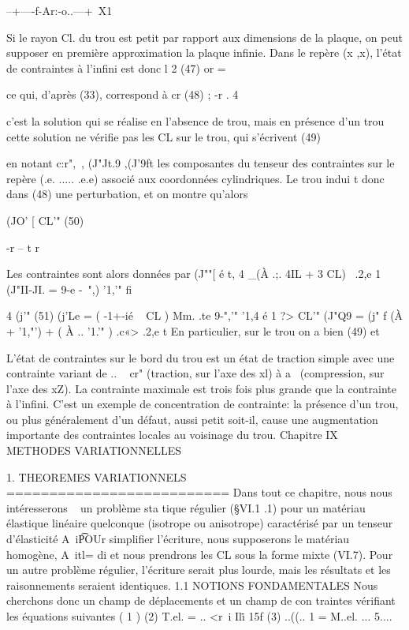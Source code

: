 {{{{{--+----f-Ar:-o..---+~X1 


Si le rayon Cl. du trou est petit par rapport aux dimensions de la plaque, on peut supposer en première approximation la plaque infinie. Dans le repère (x ,x), l'état de contraintes à l'infini est donc
l 2
(47) or 
= 

ce qui, d'après (33), correspond à 
cr­
(48) ; -r 
. 4 

c'est la solution qui se réalise en l'absence de trou, mais en présence d'un trou cette solution ne vérifie pas les CL sur le trou, qui s'écrivent 
(49) 


en notant c:r",~, (J"Jt.9 ,(J'9ft les composantes du tenseur des contraintes sur le repère (.e. ..... .e.e) associé aux coordonnées cylindriques. Le trou indui t donc dans (48) une perturbation, et on montre qu'alors 

(JO' [ CL'"
(50) 

-r --­
t r 

Les contraintes sont alors données par 
(J""[ é t, 4 
_(À .;. 4IL + 3 CL) ~.2,e 1
(J"II-JI. = 
9-e -~",) 
'1,'" fi} 
4
(j'"
(51) 
(j'Le = ( -1+-ié ~ CL ) Mm. .te 9-",'" '1,4 
é 1
?> CL'"
(J"Q9 = (j" f (À + '1,"') + ( À .. '1.'" ) .c«> .2,e
t 
En particulier, sur le trou on a bien (49) et 

L'état de contraintes sur le bord du trou est un état de traction simple avec une contrainte variant de .. ~ cr" (traction, sur l'axe des xl) à a~ (compression, sur l'axe des xZ). La contrainte maximale est trois fois plus grande que la contrainte à l'infini. C'est un exemple de concen­tration de contrainte: la présence d'un trou, ou plus généralement d'un dé­faut, aussi petit soit-il, cause une augmentation importante des contraintes locales au voisinage du trou. 
Chapitre IX 
METHODES VARIATIONNELLES 

1. THEOREMES VARIATIONNELS 
========================== 
Dans tout ce chapitre, nous nous intéresserons ~ un problème sta­
tique régulier (§VI.1 .1) pour un matériau élastique linéaire quelconque (isotrope ou anisotrope) caractérisé par un tenseur d'élasticité A~i\t POUr simplifier l'écriture, nous supposerons le matériau homogène, A~itl= di et nous prendrons les CL sous la forme mixte (VI.7). Pour un autre problème 
régulier, l'écriture serait plus lourde, mais les résultats et les raison­nements seraient identiques. 
1.1 NOTIONS FONDAMENTALES 
Nous cherchons donc un champ de déplacements et un champ de con­
traintes vérifiant les équations suivantes 
( 1 ) 
(2) T.el. 
= ..
<r~i Il\.i 15f 
(3) ..((.. 1 = M..el. 
... 5....  

}}}}
